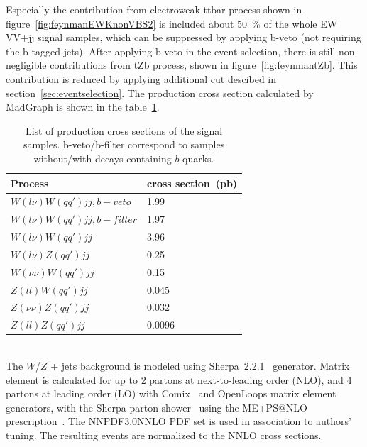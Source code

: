 Especially the contribution from electroweak ttbar process shown in figure~\ref{fig:feynmanEWKnonVBS2} is included about 50~\% of the whole EW VV+jj signal samples, which can be suppressed by applying b-veto (not requiring the b-tagged jets). After applying b-veto in the event selection, there is still non-negligible contributions from tZb process, shown in figure~\ref{fig:feynmantZb}. This contribution is reduced by applying additional cut descibed in section~\ref{sec:eventselection}.
The production cross section calculated by MadGraph is shown in the table~\ref{tab:VBS_sig_samples}. \\ 
\begin{table}[!htbp]
\begin{center}
\small
\begin{tabular}{|l|l|}
\hline
Process & cross section~(pb) \\
\hline
$W(l\nu)W(qq\prime)jj,b-veto$    &  1.99    \\
$W(l\nu)W(qq\prime)jj,b-filter$  &  1.97   \\
$W(l\nu)W(qq\prime)jj$            &  3.96   \\
$W(l\nu)Z(qq\prime)jj$            &  0.25   \\
$W(\nu\nu)W(qq\prime)jj$          &  0.15   \\
$Z(ll)W(qq\prime)jj$              &  0.045  \\
$Z(\nu\nu)Z(qq\prime)jj$          &  0.032  \\
$Z(ll)Z(qq\prime)jj$              &  0.0096 \\
\hline
\end{tabular}
\caption{List of production cross sections of the signal samples. b-veto/b-filter correspond to samples without/with decays containing $b$-quarks.}
\label{tab:VBS_sig_samples}
\end{center}
\end{table}

\noindent\textbf{} \\ 
The $W$/$Z$ + jets background is modeled using Sherpa~2.2.1~\cite{Gleisberg:2008ta} generator. 
Matrix element is calculated for up to 2 partons at next-to-leading order (NLO), and 4 partons at leading order (LO) with Comix~\cite{Gleisberg:2008fv} and OpenLoops\cite{Cascioli:2011va} matrix element generators, with the Sherpa parton shower~\cite{Schumann:2007mg} using the ME+PS@NLO prescription~\cite{Hoeche:2012yf}.
The NNPDF3.0NNLO PDF set is used in association to authors' tuning. The resulting events are normalized to the NNLO cross sections.

